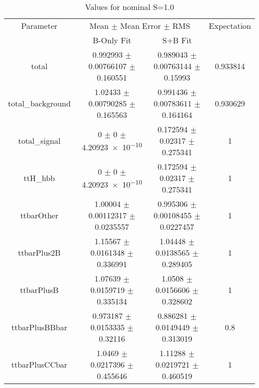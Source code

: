 \begin{table}
\centering
\caption{Values for nominal S=1.0}
\begin{tabular}{cccc}
\toprule
Parameter & \multicolumn{2}{c}{Mean $\pm$ Mean Error $\pm$ RMS} & Expectation\\
 & B-Only Fit & S+B Fit & \\
\midrule
total & \num{0.992993} $\pm$ \num{0.00766107} $\pm$ \num{0.160551} & \num{0.989043} $\pm$ \num{0.00763144} $\pm$ \num{0.15993} & \num{0.933814}\\
total\_background & \num{1.02433} $\pm$ \num{0.00790285} $\pm$ \num{0.165563} & \num{0.991436} $\pm$ \num{0.00783611} $\pm$ \num{0.164164} & \num{0.930629}\\
total\_signal & \num{0} $\pm$ \num{0} $\pm$ \num{4.20923e-10} & \num{0.172594} $\pm$ \num{0.02317} $\pm$ \num{0.275341} & \num{1}\\
ttH\_hbb & \num{0} $\pm$ \num{0} $\pm$ \num{4.20923e-10} & \num{0.172594} $\pm$ \num{0.02317} $\pm$ \num{0.275341} & \num{1}\\
ttbarOther & \num{1.00004} $\pm$ \num{0.00112317} $\pm$ \num{0.0235557} & \num{0.995306} $\pm$ \num{0.00108455} $\pm$ \num{0.0227457} & \num{1}\\
ttbarPlus2B & \num{1.15567} $\pm$ \num{0.0161348} $\pm$ \num{0.336991} & \num{1.04448} $\pm$ \num{0.0138565} $\pm$ \num{0.289405} & \num{1}\\
ttbarPlusB & \num{1.07639} $\pm$ \num{0.0159719} $\pm$ \num{0.335134} & \num{1.0508} $\pm$ \num{0.0156606} $\pm$ \num{0.328602} & \num{1}\\
ttbarPlusBBbar & \num{0.973187} $\pm$ \num{0.0153335} $\pm$ \num{0.32116} & \num{0.886281} $\pm$ \num{0.0149449} $\pm$ \num{0.313019} & \num{0.8}\\
ttbarPlusCCbar & \num{1.0469} $\pm$ \num{0.0217396} $\pm$ \num{0.455646} & \num{1.11288} $\pm$ \num{0.0219721} $\pm$ \num{0.460519} & \num{1}\\
\bottomrule
\end{tabular}
\end{table}